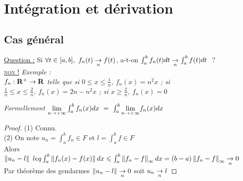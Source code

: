 \section{Intégration et dérivation}
    \subsection{Cas général}

        \underline{Question :} Si $\forall t\in [a,b] ,~f_n(t) \underset{n}{\rightarrow} f(t)$, a-t-on $\int_a^b f_n(t) dt \underset{n}{\rightarrow} \int_a^b f(t) dt~$ ?\\
        \textsc{\underline{non !}} \textit{\small Exemple : \\ 
        $f_n : {\mathbf{R}}^+ \rightarrow {\mathbf{R}}$ telle que si $0\leqslant x\leqslant \frac{1}{n}$, $f_n(x) = n^2x$ ; 
        si $\frac{1}{n} \leqslant x \leqslant \frac{2}{n},~f_n(x) = 2n-n^2x$ ; si $x\geqslant \frac{2}{n} ,~f_n(x) = 0$} \\

         \medskip

        \textit{\small Formellement ${\underset{n \rightarrow +\infty}{\lim}} \int_a^b f_n(x) dx ~=~ \int_a^b {\underset{n \rightarrow +\infty}{\lim}} f_n(x) dx$} \\
        
        \begin{proof}
        {\tiny (1)} Connu.\\
        {\tiny (2)} On note $u_n = \int_a^b f_n \in F$ et $l= \int_a^b f \in F$ \\
        Alors $\left\Vert u_n-l \right\Vert \ leq \int_a^b \left\Vert f_n(x) - f(x)  \right\Vert dx \leqslant \int_a^b \left\Vert f_n-f \right\Vert_{\infty} dx = (b-a) \left\Vert f_n-f \right\Vert_{\infty} 
        \underset{n}{\rightarrow} 0$ \\Par théorème des gendarmes $\left\Vert u_n-l \right\Vert \underset{n}{\rightarrow} 0$ soit $u_n \underset{n}{\rightarrow} l$
        \end{proof} \medskip

         \medskip

